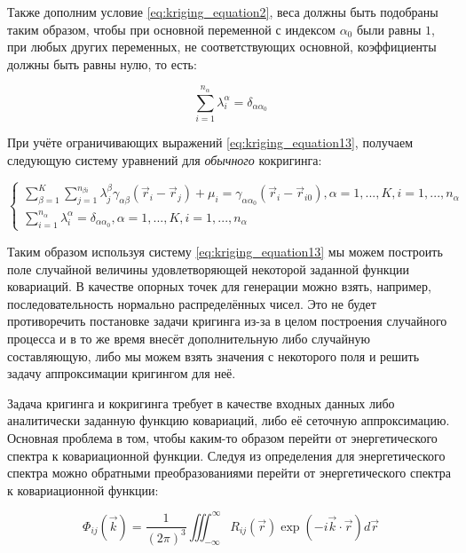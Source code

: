 Также дополним условие \eqref{eq:kriging_equation2}, веса должны быть подобраны таким образом, чтобы при основной переменной с индексом $\alpha_0$ были равны $1$, при любых других переменных, не соответствующих основной, коэффициенты должны быть равны нулю, то есть:

\begin{equation}
    \label{eq:kriging_equation13}
    \sum_{i = 1}^{n_\alpha} \lambda_i^{\alpha} = \delta_{\alpha \alpha_0}
\end{equation}

При учёте ограничивающих выражений \eqref{eq:kriging_equation13}, получаем следующую систему уравнений для \textit{обычного} кокригинга:

\[ 
\left\{
  \begin{array}{rl}
  \label{eq:kriging_equation13}
    \sum_{\beta=1}^K \sum_{j = 1}^{n_{\beta i}} \lambda_j^{\beta} \gamma_{\alpha \beta}(\vec r_i - \vec r_j) + \mu_i = \gamma_{\alpha \alpha_0}(\vec r_i - \vec r_{i0}), \alpha = 1, ..., K, i = 1,...,n_\alpha \\
    \sum_{i = 1}^{n_\alpha} \lambda_i^{\alpha} = \delta_{\alpha \alpha_0}, \alpha = 1, ..., K, i = 1,...,n_\alpha
  \end{array}
\right.
\]

Таким образом используя систему \ref{eq:kriging_equation13} мы можем построить поле случайной величины удовлетворяющей некоторой заданной функции ковариаций. В качестве опорных точек для генерации можно взять, например, последовательность нормально распределённых чисел. Это не будет противоречить постановке задачи кригинга из-за в целом построения случайного процесса и в то же время внесёт дополнительную либо случайную составляющую, либо мы можем взять значения с некоторого поля и решить задачу аппроксимации кригингом для неё. 

Задача кригинга и кокригинга требует в качестве входных данных либо аналитически заданную функцию ковариаций, либо её сеточную аппроксимацию. Основная проблема в том, чтобы каким-то образом перейти от энергетического спектра к ковариационной функции. Следуя из определения для энергетического спектра \cite{pope2000turbulent} можно обратными преобразованиями перейти от энергетического спектра к ковариационной функции:

\begin{equation}
    \label{eq:kriging_equation14}
    \Phi_{ij}(\vec{k}) = \frac{1}{(2 \pi)^3} \iiint_{-\infty}^{\infty} R_{ij}(\vec{r}) \exp{(- i \vec{k} \cdot \vec{r})} d\vec{r}
\end{equation}


